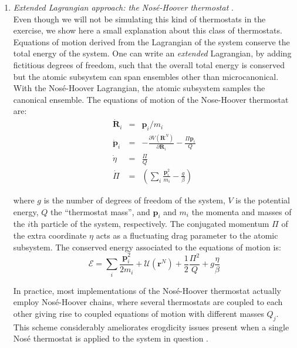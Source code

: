 \documentclass[a4paper,11pt]{scrartcl}
\begin{document}
\begin{enumerate}
\item \textit{Extended Lagrangian approach: the Nos\'{e}-Hoover thermostat} \cite{frenkel-smit,nosehoover}.\\ Even though we will not be simulating this kind of thermostats in the exercise, we show here a small explanation about this class of thermostats. Equations of motion derived from the Lagrangian of the system conserve the total energy of the system. One can write an \emph{extended} Lagrangian, by adding fictitious degrees of freedom, such that the overall total energy is conserved but the atomic subsystem can span ensembles other than microcanonical. With the Nos\'{e}-Hoover Lagrangian, the atomic subsystem samples the canonical ensemble. The equations of motion of the Nose-Hoover thermostat are:
\begin{eqnarray}
 \mathbf{\dot{R}}_i &=& \mathbf{p}_i/m_i\\
 \mathbf{\dot{p}}_i &=& -\frac{\partial V\left( \mathbf{R}^N \right)}{\partial \mathbf{R}_i} - \frac{\Pi \mathbf{p}_i}{Q}\\
 \dot{\eta} &=& \frac{\Pi}{Q} \\
 \dot{\Pi} &=& \left( \sum_i \frac{\mathbf{p}_i^2}{m_i} - \frac{g}{\beta} \right)
\end{eqnarray}

where $g$ is the number of degrees of freedom of the system, $V$ is the potential energy, $Q$ the ``thermostat mass'', and $\mathbf{p}_i$ and $m_i$
the momenta and masses of the $i$th particle of the system, respectively. The conjugated momentum $\Pi$ of the extra coordinate $\eta$ acts as a fluctuating drag parameter to the atomic subsystem. The conserved energy associated to the equations of motion is:
\begin{equation}
 \mathscr{E} = \sum_i \frac{\mathbf{p}_i^2}{2m_i} + \mathscr{U} \left( \mathbf{r}^N \right) + \frac{1}{2} \frac {\Pi ^2}{Q} + g \frac{\eta}{\beta}
\end{equation}

In practice, most implementations of the Nos\'e-Hoover thermostat actually employ Nos\'e-Hoover chains, where several thermostats are coupled to each other giving rise to coupled equations of motion with different masses $Q_j$. This scheme considerably ameliorates erogdicity issues present when a single Nos\'e thermostat is applied to the system in question \cite{martyna}.


\end{enumerate}
\end{document}
